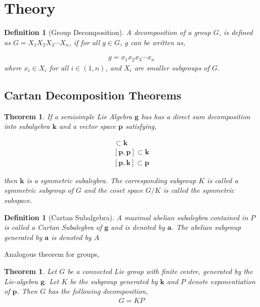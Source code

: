 \documentclass{amsart}
\newtheorem{defn}[]{Definition}
\newtheorem{thm}[]{Theorem}
\begin{document}
\section{Theory}

\begin{defn}[Group Decomposition]

 A decomposition of a group $G$, is defined as $G=X_1X_2X_3\cdots X_n$, if for all $g\in G$, $g$ can be written as,

\begin{align*}
    g=x_1x_2x_3\cdots x_n
\end{align*}
where $x_i\in X_i$ for all $i\in (1,n)$, and $X_i$ are smaller subgroups of $G$.


\end{defn}

\subsection*{Cartan Decomposition Theorems}\cite{divakaran1980decomposition}


\begin{thm}
If a semisimple Lie Algebra $\mathbf{g}$ has has a direct sum decomposition into subalgebra $\mathbf{k}$ and a vector space $\mathbf{p}$ satisfying,

\begin{align*}
    [\mathbf{k},\mathbf{k}] \subset \mathbf{k}\\
    [\mathbf{p},\mathbf{p}] \subset \mathbf{k}\\
    [\mathbf{p},\mathbf{k}] \subset \mathbf{p}
\end{align*}

then $\mathbf{k}$ is a symmetric subalegbra. The corresponding subgroup $K$ is called a symmetric subgroup of $G$ and the coset space $G/K$ is called the symmetric subspace.
\end{thm}



\begin{defn}[Cartan Subalgebra]
 A maximal abelian subalegbra contained in $P$ is called a Cartan Subalegbra of $\mathbf{g}$ and is denoted by $\mathbf{a}$. The abelian subgroup generated by $\mathbf{a}$ is denoted by $A$
\end{defn}

Analogous theorem for groups,

\begin{thm}
    Let $G$ be a connected Lie group with finite centre, generated by the Lie-algebra $\mathbf{g}$. Let $K$ be the subgroup generated by $\mathbf{k}$ and $P$ denote exponentiation of $\mathbf{p}$. Then $G$ has the following decomposition,
    \begin{align*}
        G=KP
    \end{align*}
\end{thm}
\end{document}

